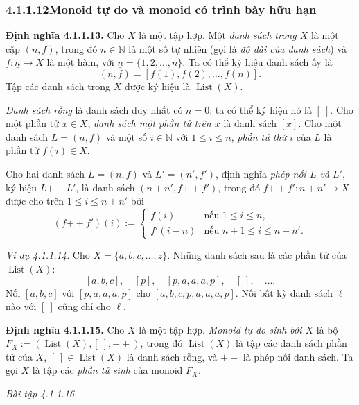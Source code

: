 \subsubsection*{4.1.1.12\quad Monoid tự do và monoid có trình bày hữu hạn}

\noindent\textbf{Định nghĩa 4.1.1.13.} Cho $X$ là một tập hợp. Một \emph{danh sách trong $X$} là một cặp $(n,f)$, trong đó $n\in\mathbb{N}$ là một số tự nhiên (gọi là \emph{độ dài của danh sách}) và $f:\underline{n}\to X$ là một hàm, với $\underline{n}=\{1,2,\ldots,n\}$. Ta có thể ký hiệu danh sách ấy là
\[
(n,f)=[f(1),f(2),\ldots,f(n)].
\]
Tập các danh sách trong $X$ được ký hiệu là $\operatorname{List}(X)$.

\emph{Danh sách rỗng} là danh sách duy nhất có $n=0$; ta có thể ký hiệu nó là $[\ ]$. Cho một phần tử $x\in X$, \emph{danh sách một phần tử trên $x$} là danh sách $[x]$. Cho một danh sách $L=(n,f)$ và một số $i\in\mathbb{N}$ với $1\le i\le n$, \emph{phần tử thứ $i$} của $L$ là phần tử $f(i)\in X$.

Cho hai danh sách $L=(n,f)$ và $L'=(n',f')$, định nghĩa \emph{phép nối $L$ và $L'$}, ký hiệu $L\mathbin{+\!+}L'$, là danh sách $(n+n',f\mathbin{+\!+}f')$, trong đó $f\mathbin{+\!+}f':\underline{n+n'}\to X$ được cho trên $1\le i\le n+n'$ bởi
\[
(f\mathbin{+\!+}f')(i):=
\begin{cases}
f(i)&\text{nếu }1\le i\le n,\\
f'(i-n)&\text{nếu }n+1\le i\le n+n'.
\end{cases}
\]

\noindent\textit{Ví dụ 4.1.1.14.} Cho $X=\{a,b,c,\ldots,z\}$. Những danh sách sau là các phần tử của $\operatorname{List}(X)$:
\[
[a,b,c],\quad[p],\quad[p,a,a,a,p],\quad[\ ],\quad\ldots.
\]
Nối $[a,b,c]$ với $[p,a,a,a,p]$ cho $[a,b,c,p,a,a,a,p]$. Nối bất kỳ danh sách $\ell$ nào với $[\ ]$ cũng chỉ cho $\ell$.

\noindent\textbf{Định nghĩa 4.1.1.15.} Cho $X$ là một tập hợp. \emph{Monoid tự do sinh bởi $X$} là bộ $F_X:=(\operatorname{List}(X),[\ ],\mathbin{+\!+})$, trong đó $\operatorname{List}(X)$ là tập các danh sách phần tử của $X$, $[\ ]\in\operatorname{List}(X)$ là danh sách rỗng, và $\mathbin{+\!+}$ là phép nối danh sách. Ta gọi $X$ là tập các \emph{phần tử sinh} của monoid $F_X$.

\noindent\textit{Bài tập 4.1.1.16.}\keepwithnext

